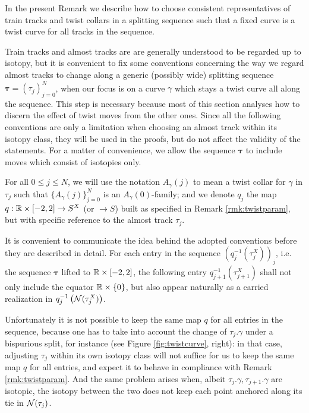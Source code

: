 \begin{rmk}\label{rmk:permanenceconventions}
In the present Remark we describe how to choose consistent representatives of train tracks and twist collars in a splitting sequence such that a fixed curve is a twist curve for all tracks in the sequence.

Train tracks and almost tracks are are generally understood to be regarded up to isotopy, but it is convenient to fix some conventions concerning the way we regard almost tracks to change along a generic (possibly wide) splitting sequence $\bm\tau=(\tau_j)_{j=0}^N$, when our focus is on a curve $\gamma$ which stays a twist curve all along the sequence. This step is necessary because most of this section analyses how to discern the effect of twist moves from the other ones. Since all the following conventions are only a limitation when choosing an almost track within its isotopy class, they will be used in the proofs, but do not affect the validity of the statements. For a matter of convenience, we allow the sequence $\bm\tau$ to include moves which consist of isotopies only.

For all $0\leq j\leq N$, we will use the notation $A_\gamma(j)$ to mean a twist collar for $\gamma$ in $\tau_j$ such that $\{A_\gamma(j)\}_{j=0}^N$ is an $A_\gamma(0)$-family; and we denote $q_j$ the map $q:\mathbb R\times[-2,2]\rightarrow S^X$ (or $\rightarrow S$) built as specified in Remark \ref{rmk:twistparam}, but with specific reference to the almost track $\tau_j$.

It is convenient to communicate the idea behind the adopted conventions before they are described in detail. For each entry in the sequence $\left(q_j^{-1}(\tau_j^X)\right)_j$, i.e. the sequence $\bm\tau$ lifted to $\mathbb R\times[-2,2]$, the following entry $q_{j+1}^{-1}(\tau_{j+1}^X)$ shall not only include the equator $\mathbb R\times\{0\}$, but also appear naturally as a carried realization in $q_j^{-1}\left({\mathcal N}(\tau_j^X)\right)$.

Unfortunately it is not possible to keep the same map $q$ for all entries in the sequence, because one has to take into account the change of $\tau_j.\gamma$ under a bispurious split, for instance (see Figure \ref{fig:twistcurve}, right): in that case, adjusting $\tau_j$ within its own isotopy class will not suffice for us to keep the same map $q$ for all entries, and expect it to behave in compliance with Remark \ref{rmk:twistparam}. And the same problem arises when, albeit $\tau_j.\gamma,\tau_{j+1}.\gamma$ are isotopic, the isotopy between the two does not keep each point anchored along its tie in ${\mathcal N}(\tau_j)$.


\end{rmk}
